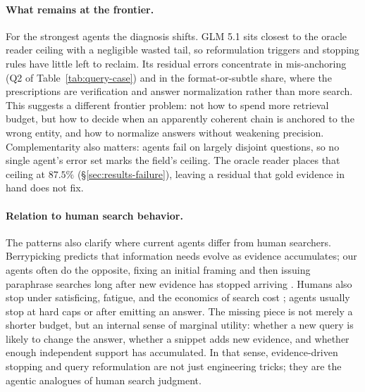 \paragraph{What remains at the frontier.} For the strongest agents the diagnosis shifts. GLM 5.1 sits closest to the oracle reader ceiling with a negligible wasted tail, so reformulation triggers and stopping rules have little left to reclaim. Its residual errors concentrate in mis-anchoring (Q2 of Table~\ref{tab:query-case}) and in the format-or-subtle share, where the prescriptions are verification and answer normalization rather than more search. This suggests a different frontier problem: not how to spend more retrieval budget, but how to decide when an apparently coherent chain is anchored to the wrong entity, and how to normalize answers without weakening precision. Complementarity also matters: agents fail on largely disjoint questions, so no single agent's error set marks the field's ceiling. The oracle reader places that ceiling at $87.5\%$ (§\ref{sec:results-failure}), leaving a residual that gold evidence in hand does not fix.

\paragraph{Relation to human search behavior.} The patterns also clarify where current agents differ from human searchers. Berrypicking \citep{bates1989berrypicking} predicts that information needs evolve as evidence accumulates; our agents often do the opposite, fixing an initial framing and then issuing paraphrase searches long after new evidence has stopped arriving \citep{huang2009analyzing, rieh2006analysis}. Humans also stop under satisficing, fatigue, and the economics of search cost \citep{zach2005enough, azzopardi2014economic}; agents usually stop at hard caps or after emitting an answer. The missing piece is not merely a shorter budget, but an internal sense of marginal utility: whether a new query is likely to change the answer, whether a snippet adds new evidence, and whether enough independent support has accumulated. In that sense, evidence-driven stopping and query reformulation are not just engineering tricks; they are the agentic analogues of human search judgment.
